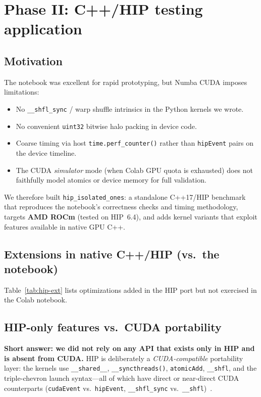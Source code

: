 \documentclass[11pt,a4paper]{article}
\begin{document}
\section{Phase II: C++/HIP testing application}
\label{sec:phase2}

\subsection{Motivation}

The notebook was excellent for rapid prototyping, but Numba CUDA imposes
limitations:
\begin{itemize}
  \item No \texttt{\_\_shfl\_sync} / warp shuffle intrinsics in the Python
        kernels we wrote.
  \item No convenient \texttt{uint32} bitwise halo packing in device code.
  \item Coarse timing via host \texttt{time.perf\_counter()} rather than
        \texttt{hipEvent} pairs on the device timeline.
  \item The CUDA \emph{simulator} mode (when Colab GPU quota is exhausted) does
        not faithfully model atomics or device memory for full validation.
\end{itemize}

We therefore built \texttt{hip\_isolated\_ones}: a standalone C++17/HIP
benchmark that reproduces the notebook's correctness checks and timing
methodology, targets \textbf{AMD ROCm} (tested on HIP~6.4), and adds kernel
variants that exploit features available in native GPU C++.

\subsection{Extensions in native C++/HIP (vs.\ the notebook)}

Table~\ref{tab:hip-ext} lists optimizations added in the HIP port but not
exercised in the Colab notebook.

\subsection{HIP-only features vs.\ CUDA portability}
\label{sec:hip-vs-cuda}

\textbf{Short answer: we did not rely on any API that exists only in HIP and is
absent from CUDA.}
HIP is deliberately a \emph{CUDA-compatible} portability layer: the kernels use
\texttt{\_\_shared\_\_}, \texttt{\_\_syncthreads()}, \texttt{atomicAdd},
\texttt{\_\_shfl}, and the triple-chevron launch syntax---all of which have
direct or near-direct CUDA counterparts (\texttt{cudaEvent} vs.\ \texttt{hipEvent},
\texttt{\_\_shfl\_sync} vs.\ \texttt{\_\_shfl})~\cite{hip-faq,hipify-device-api}.
\end{document}

